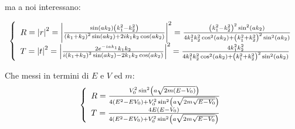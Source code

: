 ma a noi interessano:

\begin{equation}
  \lr\{.{\begin{array}{l}
      R = \lr||{r}^2 = \lr||{\frac{\sin\lrt{a k_2}\lrt{k_1^2-k_2^2}}{\lrt{k_1+k_2}^2 \sin\lrt{a k_2}+2 i k_1 k_2 \cos\lrt{a k_2}}}^2=
      \frac{\lrt{k_1^2-k_2^2}^2\sin^2\lrt{a k_2}}{4 k_1^2 k_2^2 \cos^2\lrt{a k_2}+\lrt{k_1^2+k_2^2}^2\sin^2\lrt{a k_2}}\\
      T = \lr||{t}^2 = \lr||{\frac{2e^{-i a k_1}k_1 k_2}{i\lrt{k_1+k_2}^2 \sin\lrt{a k_2}-2k_1 k_2 \cos\lrt{a k_2}}}^2=
      \frac{4 k_1^2 k_2^2}{4 k_1^2 k_2^2 \cos^2\lrt{a k_2}+\lrt{k_1^2+k_2^2}^2\sin^2\lrt{a k_2}}
  \end{array}}
\end{equation}

Che messi in termini di $E$ e $V$ ed $m$:
\begin{equation}
  \lr\{.{\begin{array}{l}
      R = \frac{V_0^2\sin^2\lrt{a \sqrt{2m \lrt{E-V_0}}}}
      {4 \lrt{E^2 - EV_0} +V_0^2\sin^2\lrt{a \sqrt{2m \sqrt{E-V_0}}}}\\
      T = \frac{4 E\lrt{E-V_0}}
      {4 \lrt{E^2 - EV_0} +V_0^2\sin^2\lrt{a \sqrt{2m \sqrt{E-V_0}}}}
  \end{array}}
\end{equation}

